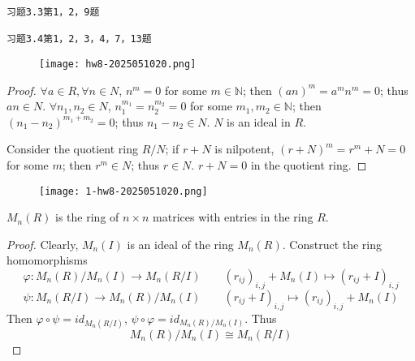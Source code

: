 \begin{lstlisting}
习题3.3第1，2，9题

习题3.4第1，2，3，4，7，13题
\end{lstlisting}
\begin{exercise}
\begin{figure}[H]
\centering
\texttt{[image: hw8-2025051020.png]}
\label{}
\end{figure}
\end{exercise}
\begin{proof}
$\forall a\in R,\forall n\in N$, $n^{m}=0$ for some $m\in \mathbb{N}$; then $(an)^{m}=a^{m}n^{m}=0$; thus $an\in N$. $\forall n_1, n_2\in N$, $n_1^{m_1}=n_2^{m_2}=0$ for some $m_1, m_2\in \mathbb{N}$; then $(n_1-n_2)^{m_1+m_2}=0$; thus $n_1-n_2\in N$. $N$ is an ideal in $R$.

Consider the quotient ring $R/N$; if $r+N$ is nilpotent, $(r+N)^{m}=r^{m}+N=0$ for some $m$; then $r^{m}\in N$; thus $r\in N$. $r+N=0$ in the quotient ring.
\end{proof}

\begin{exercise}
\begin{figure}[H]
\centering
\texttt{[image: 1-hw8-2025051020.png]}
\label{}
\end{figure}
\end{exercise}
\begin{note}
$M_n(R)$ is the ring of $n \times n$ matrices with entries in the ring $R$.
\end{note}
\begin{proof}
Clearly, $M_n(I)$ is an ideal of the ring $M_n(R)$. Construct the ring homomorphisms
\[
\varphi:M_n(R)/M_n(I)\to M_n(R/I) \qquad (r_{ij})_{i,j}+M_n(I)\mapsto(r_{ij}+I)_{i,j}
\]
\[
\psi:M_n(R/I)\to M_n(R)/M_n(I)\qquad (r_{ij}+I)_{i,j}\mapsto(r_{ij})_{i,j}+M_n(I)
\]
Then $\varphi \circ \psi=id_{M_n(R/I)}$, $\psi \circ\varphi=id_{M_n(R)/M_n(I)}$. Thus
\[
M_n(R)/M_n(I)\cong M_n(R/I)
\]
\end{proof}

